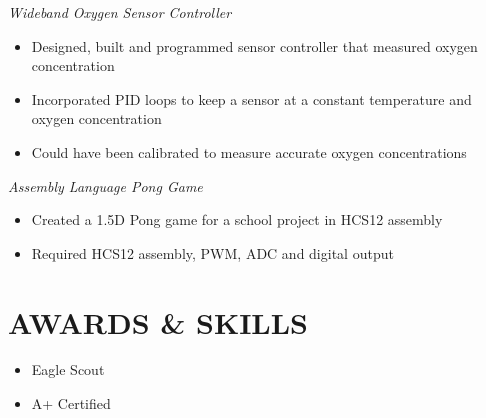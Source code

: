 \documentclass[line,margin]{res}
\begin{document}
\begin{resume}
\begin{itemize}
		\end{itemize}
	\vspace{-10pt}
	{\sl Wideband Oxygen Sensor Controller}
		\begin{itemize} \itemsep -2pt
			\item Designed, built and programmed sensor controller that measured oxygen concentration
			\item Incorporated PID loops to keep a sensor at a constant temperature and oxygen concentration
			\item Could have been calibrated to measure accurate oxygen concentrations
		\end{itemize}


	\vspace{-10pt}
	{\sl Assembly Language Pong Game}
		\begin{itemize} \itemsep -2pt
			\item Created a 1.5D Pong game for a school project in HCS12 assembly
			\item Required HCS12 assembly, PWM, ADC and digital output
		\end{itemize}
\section{AWARDS \& SKILLS } 
		\begin{multicols}{2}
			\begin{itemize}
				\itemsep -2pt
				\item[] Eagle Scout
				\item[] A+ Certified


\end{itemize}
\end{multicols}
\end{resume}
\end{document}

